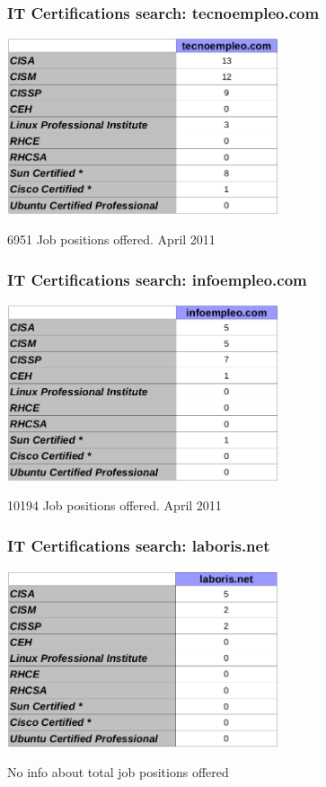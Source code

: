 \documentclass{beamer}
\begin{document}
\begin{frame}
\frametitle{IT Certifications search: tecnoempleo.com}
\begin{center}
  \includegraphics[width=8cm]{figs/tecnoempleo.png}
\end{center}
\begin{center}
\normalsize{6951 Job positions offered. April 2011}
\end{center}
\end{frame}



\begin{frame}
\frametitle{IT Certifications search: infoempleo.com}
\begin{center}
  \includegraphics[width=8cm]{figs/infoempleo.png}
\end{center}
\begin{center}
\normalsize{10194 Job positions offered. April 2011}
\end{center}
\end{frame}



\begin{frame}
\frametitle{IT Certifications search: laboris.net}
\begin{center}
  \includegraphics[width=8cm]{figs/laboris.png}
\end{center}
\begin{center}
\normalsize{No info about total job positions offered}
\end{center}
\end{frame}
\end{document}
